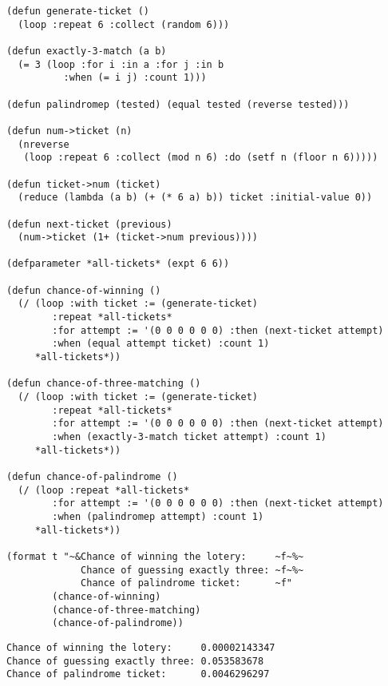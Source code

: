 \documentclass[11pt]{article}
\begin{document}
\lstset{language=Lisp,numbers=none}
\begin{lstlisting}
(defun generate-ticket ()
  (loop :repeat 6 :collect (random 6)))

(defun exactly-3-match (a b)
  (= 3 (loop :for i :in a :for j :in b
          :when (= i j) :count 1)))

(defun palindromep (tested) (equal tested (reverse tested)))

(defun num->ticket (n)
  (nreverse
   (loop :repeat 6 :collect (mod n 6) :do (setf n (floor n 6)))))

(defun ticket->num (ticket)
  (reduce (lambda (a b) (+ (* 6 a) b)) ticket :initial-value 0))

(defun next-ticket (previous)
  (num->ticket (1+ (ticket->num previous))))

(defparameter *all-tickets* (expt 6 6))

(defun chance-of-winning ()
  (/ (loop :with ticket := (generate-ticket)
        :repeat *all-tickets*
        :for attempt := '(0 0 0 0 0 0) :then (next-ticket attempt)
        :when (equal attempt ticket) :count 1)
     *all-tickets*))

(defun chance-of-three-matching ()
  (/ (loop :with ticket := (generate-ticket)
        :repeat *all-tickets*
        :for attempt := '(0 0 0 0 0 0) :then (next-ticket attempt)
        :when (exactly-3-match ticket attempt) :count 1)
     *all-tickets*))

(defun chance-of-palindrome ()
  (/ (loop :repeat *all-tickets*
        :for attempt := '(0 0 0 0 0 0) :then (next-ticket attempt)
        :when (palindromep attempt) :count 1)
     *all-tickets*))

(format t "~&Chance of winning the lotery:     ~f~%~
             Chance of guessing exactly three: ~f~%~
             Chance of palindrome ticket:      ~f"
        (chance-of-winning)
        (chance-of-three-matching)
        (chance-of-palindrome))
\end{lstlisting}

\begin{verbatim}
Chance of winning the lotery:     0.00002143347
Chance of guessing exactly three: 0.053583678
Chance of palindrome ticket:      0.0046296297
\end{verbatim}
\end{document}
